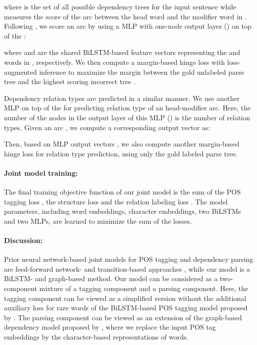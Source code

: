 \documentclass[11pt,letterpaper]{article}
\begin{document}
\noindent where  is the set of all possible dependency trees for the input sentence  while  measures the score of the arc between the head  word and the modifier  word in  . Following \citet{TACL885}, we score an arc by using a MLP with one-node output layer () on top of the :

  

\noindent where  and  are the shared BiLSTM-based feature vectors representing the   and    words in , respectively.  We then compute a  margin-based hinge loss  with loss-augmented inference  to maximize the margin between the gold unlabeled parse tree and the highest scoring incorrect tree \citep{TACL885}.


Dependency relation types are  predicted in a similar manner. We use another MLP on top of the  for predicting relation type of an head-modifier  arc. Here, the number of the nodes in the output layer of this MLP () is the number of relation types.  Given an arc , we compute a corresponding  output vector as:

  

Then, based on MLP output vectors , we also compute another margin-based hinge loss   for relation type prediction, using only the gold labeled parse tree.   


\paragraph{Joint model training:} The final training objective function of our joint model is the sum of the POS tagging loss , the structure loss  and the relation labeling loss . The model parameters, including word embeddings, character embeddings,  two BiLSTMs and two MLPs, are learned to minimize the sum of the losses.


\paragraph{Discussion:} Prior neural network-based joint models for  POS tagging and dependency parsing are feed-forward network- and transition-based approaches \citep{alberti-EtAl:2015:EMNLP,zhang-weiss:2016:P16-1}, while our model is a BiLSTM- and graph-based method.  Our model  can be considered as a two-component mixture of a tagging  component and a parsing component. Here, the tagging component can be viewed as a simplified version without  the additional auxiliary loss for rare words of the  BiLSTM-based POS tagging model proposed by \citet{plankP16}. The parsing component can be viewed as an extension of the  graph-based dependency model proposed by \citet{TACL885}, where we replace the input POS tag embeddings by the character-based representations of words. 
\end{document}
